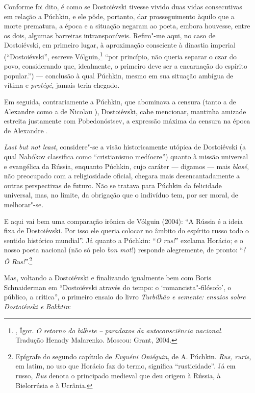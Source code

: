 Conforme foi dito, é como se Dostoiévski tivesse vivido duas vidas
consecutivas em relação a Púchkin, e ele pôde, portanto, dar
prosseguimento àquilo que a morte prematura, a época e a situação
negaram ao poeta, embora houvesse, entre os dois, algumas
barreiras intransponíveis. Refiro"-me aqui, no caso de
Dostoiévski, em primeiro lugar, à aproximação consciente
à dinastia imperial (``Dostoiévski'', escreve
Vólguin,\footnote{, Ígor. \emph{O
retorno do bilhete -- paradoxos da autoconsciência
nacional.} Tradução Henady Malarenko. Moscou: Grant, 2004.} ``por
princípio, não queria separar o czar do povo, considerando que,
idealmente, o primeiro deve ser a encarnação do espírito popular.'') --- conclusão à qual Púchkin, mesmo em sua situação ambígua de vítima e \emph{protégé}, jamais teria chegado.

Em seguida, contrariamente a Púchkin, que abominava a censura
(tanto a de Alexandre  como a de Nicolau ),
Dostoiévski, cabe mencionar, mantinha amizade estreita justamente com Pobedonóstsev, a expressão máxima da censura na época de Alexandre .

\emph{Last but not least}, considere"-se a visão historicamente utópica de Dostoiévski (a qual
Nabókov classifica como ``cristianismo medíocre'') quanto à
missão universal e evangélica da Rússia, enquanto Púchkin, cujo
caráter --- digamos --- mais \emph{blasé}, não preocupado com a
religiosidade oficial, chegara mais desencantadamente a outras
perspectivas de futuro. Não se tratava para Púchkin da felicidade
universal, mas, no limite, da obrigação que o indivíduo tem, por
ser moral, de melhorar"-se.

E aqui vai bem uma comparação irônica de Vólguin (2004): ``A
Rússia é a ideia fixa de Dostoiévski. Por isso ele queria colocar no
âmbito do espírito russo todo o sentido histórico mundial''.
Já quanto a Púchkin: ``\emph{O rus!}'' exclama Horácio; e o nosso poeta nacional (não só pelo \emph{bon mot}!) responde alegremente, de pronto: ``\emph{{}! Ó Rus!}''.\footnote{Epígrafe do segundo capítulo de \emph{Evguéni Oniéguin}, de A. Púchkin. \emph{Rus, ruris}, em latim, no uso que Horácio faz do termo, significa ``rusticidade''. Já em russo, \emph{Rus} denota o principado medieval que deu origem à Rússia, à Bielorrúsia e à Ucrânia.}

Mas, voltando a Dostoiévski e finalizando igualmente bem com Boris
Schnaiderman em ``Dostoiévski através do tempo: o
`romancista"-filósofo', o público, a crítica'', o primeiro
ensaio do livro \emph{Turbilhão e semente: ensaios sobre
Dostoiévski e Bakhtin}:

